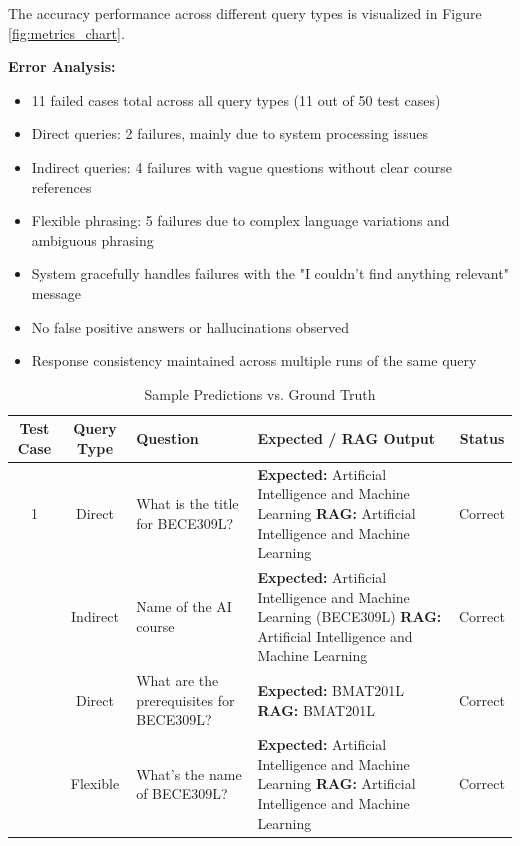 \documentclass[conference]{IEEEtran}
\begin{document}
The accuracy performance across different query types is visualized in Figure \ref{fig:metrics_chart}.

\textbf{Error Analysis:}
\begin{itemize}
    \item 11 failed cases total across all query types (11 out of 50 test cases)
    \item Direct queries: 2 failures, mainly due to system processing issues
    \item Indirect queries: 4 failures with vague questions without clear course references
    \item Flexible phrasing: 5 failures due to complex language variations and ambiguous phrasing
    \item System gracefully handles failures with the "I couldn't find anything relevant" message
    \item No false positive answers or hallucinations observed
    \item Response consistency maintained across multiple runs of the same query
\end{itemize}



\begin{table}[t!]
\caption{Sample Predictions vs. Ground Truth}
\centering
\renewcommand{\arraystretch}{1.4} %
\begin{tabularx}{\textwidth}{@{}c c >{\raggedright\arraybackslash}X >{\raggedright\arraybackslash}X c@{}}
\toprule
\textbf{Test Case} & \textbf{Query Type} & \textbf{Question} & \textbf{Expected / RAG Output} & \textbf{Status} \\
\midrule
1 & Direct & What is the title for BECE309L? & \textbf{Expected:} Artificial Intelligence and Machine Learning \newline \textbf{RAG:} Artificial Intelligence and Machine Learning & Correct \\
\addlinespace
2 & Indirect & Name of the AI course & \textbf{Expected:} Artificial Intelligence and Machine Learning (BECE309L) \newline \textbf{RAG:} Artificial Intelligence and Machine Learning & Correct \\
\addlinespace
3 & Direct & What are the prerequisites for BECE309L? & \textbf{Expected:} BMAT201L \newline \textbf{RAG:} BMAT201L & Correct \\
\addlinespace
4 & Flexible & What's the name of BECE309L? & \textbf{Expected:} Artificial Intelligence and Machine Learning \newline \textbf{RAG:} Artificial Intelligence and Machine Learning & Correct \\
\bottomrule
\end{tabularx}
\label{tab:visual_results}
\end{table}
\end{document}
